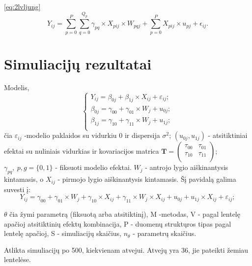 \documentclass[12pt,a4paper]{article}
\begin{document}
\ref{eq:2lvljung}
\begin{equation} 
Y_{ij} =\sum^P_{p = 0} \sum^{Q_p}_{q=0}\gamma_{pq}\times X_{pij}\times W_{pqj}+\sum^P_{p = 0} X_{pij}\times u_{pj}+\epsilon_{ij}.
\end{equation}

\newpage
\section{Simuliacijų rezultatai}

Modelis,
\begin{equation} \label{eq:2lvldelpish}
\left\{
\begin{array}{l}
Y_{ij} = \beta_{0j}+ \beta_{1j}\times X_{ij}+\varepsilon_{ij}; \\
\beta_{0j} = \gamma_{00} +\gamma_{01}\times W_{j}+u_{0j};\\
\beta_{1j} = \gamma_{10} +\gamma_{11}\times W_{j}+u_{1j};\\
\end{array} \right.
\end{equation}
čia $\varepsilon_{ij}$ -modelio paklaidos su vidurkiu $0$ ir dispersija $\sigma^2$; $\left(u_{0j}, u_{1j}\right)$ - atsitiktiniai efektai su nuliniais vidurkias ir kovariacijos matrica $\mathbf{T}=\begin{pmatrix}
\tau_{00} & \tau_{01} \\
\tau_{10} & \tau_{11} \\
\end{pmatrix}$; $\gamma_{pq},\ p,g = \{0,1\}$ - fiksuoti modelio efektai. $W_j$ - antrojo lygio aiškinantysis kintamasis, o $X_{ij}$ - pirmojo lygio aiškinantysis kintamasis. Šį pavidalą galima suvesti į:
\begin{equation} \label{eq:deq}
Y_{ij} = \gamma_{00} +\gamma_{01}\times W_{j}+ \gamma_{10}\times X_{ij}+\gamma_{11}\times W_{j}\times X_{ij}+u_{0j}+u_{1j}\times X_{ij}+\varepsilon_{ij};
\end{equation}

$\theta$ čia žymi parametrą (fiksuotą arba atsitiktinį), M -metodas, V - pagal lentelę apačioj atsitiktinių efektų kombinacija, P - duomenų struktųros tipas pagal lentelę apačioj, S - simuliacijų skaičius, $n_{\theta}$ - parametrų skaičius.

Atlikta simuliacijų po 500, kiekvienam atvejui. Atvejų yra 36, jie pateikti žemiau lentelėse. 
\end{document}
